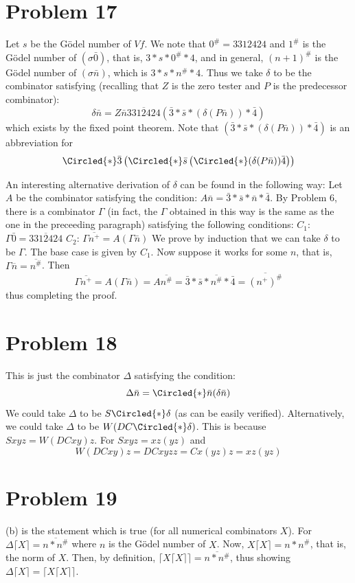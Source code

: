 \documentclass{article}
\theoremstyle{definition}
\begin{document}
\section*{Problem 17}
Let $s$ be the Gödel number of $Vf$. We note that $0^\#=3312424$ and $1^\#$ is the Gödel number of $(\sigma\bar{0})$, that is, $3*s*0^\#*4$, and in general, 
$(n+1)^\#$ is the Gödel number of $(\sigma\bar{n})$, which is $3*s*n^\#*4$. Thus we take $\delta$ to be the combinator satisfying (recalling that $Z$ is the zero tester and 
$P$ is the predecessor combinator):
\[ \delta\bar{n}=Z\bar{n}\overline{3312424}(\bar{3}*\bar{s}*(\delta (P\bar{n}))*\bar{4}) \]
which exists by the fixed point theorem. Note that $(\bar{3}*\bar{s}*(\delta(P\bar{n}))*\bar{4})$ is an abbreviation for 
\[ \Circled{*}\bar{3}\left(\Circled{*}\bar{s}\left(\Circled{*}(\delta (P\bar{n}))\bar{4}\right)\right) \]


An interesting alternative derivation of $\delta$ can be found in the following way: Let $A$ be the combinator satisfying the condition: 
$A\bar{n}=\bar{3}*\bar{s}*\bar{n}*\bar{4}$. By Problem 6, there is a combinator $\Gamma$ (in fact, the $\Gamma$ obtained in this way is the same as the one in the preceeding paragraph) 
satisfying the following conditions:\newline
$C_1$: $\Gamma\bar{0}=\overline{3312424}$\newline
$C_2$: $\Gamma\overline{n^+}=A(\Gamma\bar{n})$\newline
We prove by induction that we can take $\delta$ to be $\Gamma$. The base case is given by $C_1$. Now suppose it works for some $n$, that is, 
$\Gamma\overline{n}=\overline{n^\#}$. Then
\[ \Gamma\overline{n^+}=A(\Gamma\bar{n})=A\overline{n^\#}=\bar{3}*\bar{s}*\overline{n^\#}*\bar{4}=\overline{(n^+)^\#} \] thus completing the proof.

\section*{Problem 18}
This is just the combinator $\Delta$ satisfying the condition:
\[ \Delta\bar{n}=\Circled{*}\bar{n}(\delta\bar{n}) \]
We could take $\Delta$ to be $S\Circled{*}\delta$ (as can be easily verified). Alternatively, we could take $\Delta$ to be $W(DC\Circled{*}\delta)$. This is because
$Sxyz=W(DCxy)z$. For $Sxyz=xz(yz)$ and \[ W(DCxy)z=DCxyzz=Cx(yz)z=xz(yz) \]

\section*{Problem 19}
(b) is the statement which is true (for all numerical combinators $X$). For $\Delta \bigl \lceil X\bigr \rceil =\overline{n*n^\#}$ where $n$ is the Gödel number of $X$.
Now, $X\bigl \lceil X\bigr \rceil =n*n^\#$, that is, the norm of $X$. 
Then, by definition, $\bigl \lceil X\bigl \lceil X\bigr \rceil \bigr \rceil =\overline{n*n^\#}$, thus showing $\Delta \bigl \lceil X\bigr \rceil =\bigl \lceil X\bigl \lceil X\bigr \rceil \bigr \rceil $.
\end{document}
